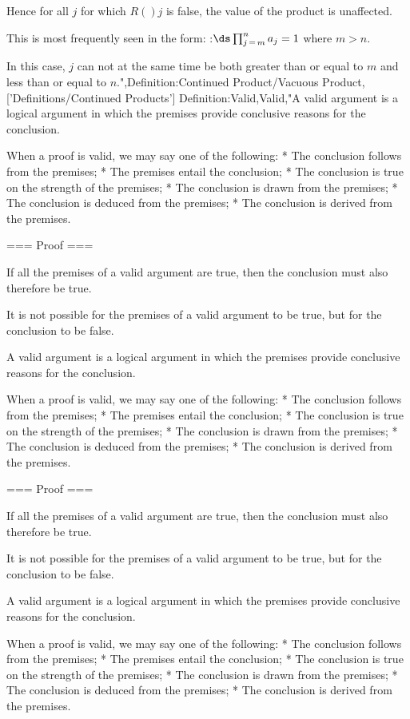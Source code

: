 Hence for all $j$ for which $R \left(   \right)j$ is false, the value of the product is unaffected.


This is most frequently seen in the form:
:$\ds \prod_{j \mathop = m}^n a_j = 1$
where $m > n$.

In this case, $j$ can not at the same time be both greater than or equal to $m$ and less than or equal to $n$.",Definition:Continued Product/Vacuous Product,['Definitions/Continued Products']
Definition:Valid,Valid,"A valid argument is a logical argument in which the premises provide conclusive reasons for the conclusion.


When a proof is valid, we may say one of the following:
* The conclusion follows from the premises;
* The premises entail the conclusion;
* The conclusion is true on the strength of the premises;
* The conclusion is drawn from the premises;
* The conclusion is deduced from the premises;
* The conclusion is derived from the premises.


=== Proof ===

If all the premises of a valid argument are true, then the conclusion must also therefore be true.

It is not possible for the premises of a valid argument to be true, but for the conclusion to be false.


A valid argument is a logical argument in which the premises provide conclusive reasons for the conclusion.


When a proof is valid, we may say one of the following:
* The conclusion follows from the premises;
* The premises entail the conclusion;
* The conclusion is true on the strength of the premises;
* The conclusion is drawn from the premises;
* The conclusion is deduced from the premises;
* The conclusion is derived from the premises.


=== Proof ===

If all the premises of a valid argument are true, then the conclusion must also therefore be true.

It is not possible for the premises of a valid argument to be true, but for the conclusion to be false.


A valid argument is a logical argument in which the premises provide conclusive reasons for the conclusion.


When a proof is valid, we may say one of the following:
* The conclusion follows from the premises;
* The premises entail the conclusion;
* The conclusion is true on the strength of the premises;
* The conclusion is drawn from the premises;
* The conclusion is deduced from the premises;
* The conclusion is derived from the premises.


